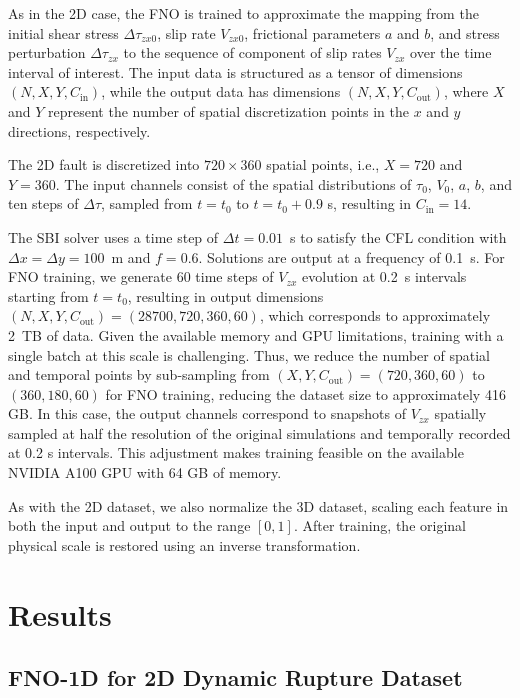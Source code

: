 \documentclass[draft]{agujournal2019}
\begin{document}
As in the 2D case, the FNO is trained to approximate the mapping from the initial shear stress \(\Delta\tau_{zx0}\), slip rate \(V_{zx0}\), frictional parameters \( a \) and \( b \), and stress perturbation \(\Delta\tau_{zx}\) to the sequence of component of slip rates \(V_{zx}\) over the time interval of interest. The input data is structured as a tensor of dimensions \( (N, X, Y, C_{\text{in}}) \), while the output data has dimensions \( (N, X, Y, C_{\text{out}}) \), where \( X \) and \( Y \) represent the number of spatial discretization points in the \( x \) and \( y \) directions, respectively.

The 2D fault is discretized into \( 720 \times 360 \) spatial points, i.e., \( X = 720 \) and \( Y = 360 \). The input channels consist of the spatial distributions of \(\tau_0\), \(V_0\), \(a\), \(b\), and ten steps of \(\Delta\tau\), sampled from \(t=t_0\) to \(t = t_0 + 0.9\) s, resulting in \( C_{\text{in}} = 14 \).

The SBI solver uses a time step of \(\Delta t = 0.01\)~s to satisfy the CFL condition with \(\Delta x = \Delta y = 100\)~m and \(f = 0.6\). Solutions are output at a frequency of 0.1~s. For FNO training, we generate 60 time steps of \(V_{zx}\) evolution at 0.2~s intervals starting from \(t = t_0\), resulting in output dimensions \((N, X, Y, C_{\text{out}}) = (28700, 720, 360, 60)\), which corresponds to approximately 2~TB of data. Given the available memory and GPU limitations, training with a single batch at this scale is challenging. Thus, we reduce the number of spatial and temporal points by sub-sampling from \( (X, Y, C_{\text{out}}) = (720, 360, 60)\) to \((360, 180, 60)\) for FNO training, reducing the dataset size to approximately 416 GB. In this case, the output channels correspond to snapshots of \(V_{zx}\) spatially sampled at half the resolution of the original simulations and temporally recorded at 0.2 s intervals. This adjustment makes training feasible on the available NVIDIA A100 GPU with 64 GB of memory.

As with the 2D dataset, we also normalize the 3D dataset, scaling each feature in both the input and output to the range \([0,1]\). After training, the original physical scale is restored using an inverse transformation.


\section{Results}
\label{sec:results}

\subsection{FNO-1D for 2D Dynamic Rupture Dataset}
\label{sec:FNO-1D}
\end{document}
